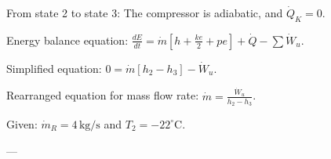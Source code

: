 From state 2 to state 3:  
The compressor is adiabatic, and \( \dot{Q}_K = 0 \).  

Energy balance equation:  
\( \frac{dE}{dt} = \dot{m} \left[ h + \frac{k e}{2} + p e \right] + \dot{Q} - \sum \dot{W}_u \).  

Simplified equation:  
\( 0 = \dot{m} \left[ h_2 - h_3 \right] - \dot{W}_u \).  

Rearranged equation for mass flow rate:  
\( \dot{m} = \frac{\dot{W}_u}{h_2 - h_3} \).  

Given:  
\( \dot{m}_R = 4 \, \text{kg/s} \) and \( T_2 = -22^\circ \text{C} \).  

---